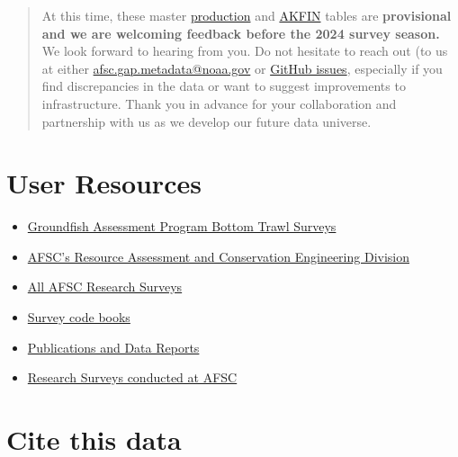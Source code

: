 \documentclass[
  letterpaper,
  oneside,
  open=any]{scrbook}
\providecommand{\tightlist}{%
  \setlength{\itemsep}{0pt}\setlength{\parskip}{0pt}}\usepackage{longtable,booktabs,array}
\begin{document}
\begin{quote}
At this time, these master
\href{https://afsc-gap-products.github.io/gap_products/content/product-intro.html}{production}
and
\href{https://afsc-gap-products.github.io/gap_products/content/akfin-intro.html}{AKFIN}
tables are \textbf{provisional and we are welcoming feedback before the
2024 survey season.} We look forward to hearing from you. Do not
hesitate to reach out (to us at either \url{afsc.gap.metadata@noaa.gov}
or
\href{https://github.com/afsc-gap-products/gap_products/issues}{GitHub
issues}, especially if you find discrepancies in the data or want to
suggest improvements to infrastructure. Thank you in advance for your
collaboration and partnership with us as we develop our future data
universe.
\end{quote}

\hypertarget{user-resources}{%
\section*{User Resources}\label{user-resources}}


\begin{itemize}
\tightlist
\item
  \href{https://www.fisheries.noaa.gov/alaska/science-data/groundfish-assessment-program-bottom-trawl-surveys}{Groundfish
  Assessment Program Bottom Trawl Surveys}
\item
  \href{https://www.fisheries.noaa.gov/about/resource-assessment-and-conservation-engineering-division}{AFSC's
  Resource Assessment and Conservation Engineering Division}
\item
  \href{https://www.fisheries.noaa.gov/alaska/ecosystems/alaska-fish-research-surveys}{All
  AFSC Research Surveys}
\item
  \href{https://www.fisheries.noaa.gov/resource/document/groundfish-survey-species-code-manual-and-data-codes-manual}{Survey
  code books}
\item
  \href{https://repository.library.noaa.gov/}{Publications and Data
  Reports}
\item
  \href{https://www.fisheries.noaa.gov/alaska/ecosystems/alaska-fish-research-surveys}{Research
  Surveys conducted at AFSC}
\end{itemize}

\hypertarget{cite-this-data}{%
\section*{Cite this data}\label{cite-this-data}}
\end{document}

